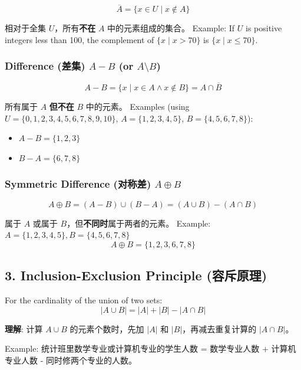\documentclass[10pt,a4paper,openany]{ctexbook}
\theoremstyle{definition}
\theoremstyle{remark}
\renewenvironment{quote}
  {\list{}{\leftmargin=1em\rightmargin=0pt\topsep=0.5pt\partopsep=0pt}\item[]}
  {\endlist}
\begin{document}
\[
\overline{A} = \{x \in U \mid x \notin A\}
\]

相对于全集 $U$，所有\textbf{不在} $A$ 中的元素组成的集合。
Example: If $U$ is positive integers less than 100, the complement of $\{x \mid x > 70\}$ is $\{x \mid x \le 70\}$.
\subsubsection{Difference (差集) $A - B$ (or $A \setminus B$)}

\[
A - B = \{x \mid x \in A \land x \notin B\} = A \cap \overline{B}
\]

所有属于 $A$ \textbf{但不在} $B$ 中的元素。
Examples (using $U = \{0,1,2,3,4,5,6,7,8,9,10\}$, $A = \{1,2,3,4,5\}$, $B = \{4,5,6,7,8\}$):
\begin{itemize}
\item $A - B = \{1,2,3\}$
\item $B - A = \{6,7,8\}$

\end{itemize}

\subsubsection{Symmetric Difference (对称差) $A \oplus B$}

\[
A \oplus B = (A - B) \cup (B - A) = (A \cup B) - (A \cap B)
\]

属于 $A$ 或属于 $B$，但\textbf{不同时}属于两者的元素。
Example: $A = \{1,2,3,4,5\}, B = \{4,5,6,7,8\}$
\[
A \oplus B = \{1,2,3,6,7,8\}
\]

\vspace{-2pt}

\subsection{3. Inclusion-Exclusion Principle (容斥原理)}

For the cardinality of the union of two sets:
\[
|A \cup B| = |A| + |B| - |A \cap B|
\]

\begin{quote}
\textbf{理解}: 计算 $A \cup B$ 的元素个数时，先加 $|A|$ 和 $|B|$，再减去重复计算的 $|A \cap B|$。

Example: 统计班里数学专业或计算机专业的学生人数 = 数学专业人数 + 计算机专业人数 - 同时修两个专业的人数。

\end{quote}
\vspace{-2pt}
\end{document}
